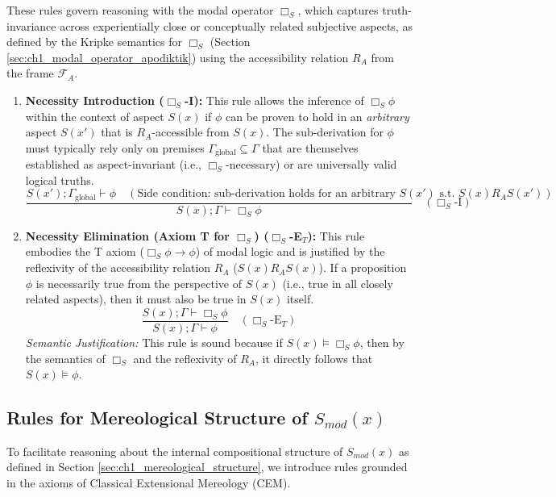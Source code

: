 \documentclass[
    12pt,              %
    a4paper,           %
    headings=normal,   %
    twoside=true,      %
    BCOR=8mm,          %
]{scrbook}
\newcommand{\BoxS}{\Box_S}
\begin{document}
These rules govern reasoning with the modal operator \(\BoxS\), which captures truth-invariance across experientially close or conceptually related subjective aspects, as defined by the Kripke semantics for \(\BoxS\) (Section \ref{sec:ch1_modal_operator_apodiktik}) using the accessibility relation \(R_A\) from the frame \(\mathcal{F}_A\).

\begin{enumerate}[label=(\alph*)]
    \item  \textbf{Necessity Introduction (\(\BoxS\)-I):}
    This rule allows the inference of \(\BoxS\phi\) within the context of aspect \(S(x)\) if \(\phi\) can be proven to hold in an \textit{arbitrary} aspect \(S(x')\) that is \(R_A\)-accessible from \(S(x)\). The sub-derivation for \(\phi\) must typically rely only on premises \(\Gamma_{\text{global}} \subseteq \Gamma\) that are themselves established as aspect-invariant (i.e., \(\BoxS\)-necessary) or are universally valid logical truths.
    \[ \frac{S(x'); \Gamma_{\text{global}} \vdash \phi \quad (\text{Side condition: sub-derivation holds for an arbitrary } S(x') \text{ s.t. } S(x) R_A S(x'))}{S(x); \Gamma \vdash \BoxS \phi} \quad (\BoxS\text{-I}) \]

    \item  \textbf{Necessity Elimination (Axiom T for \(\BoxS\)) (\(\BoxS\)-E\(_T\)):}
    This rule embodies the T axiom (\(\BoxS\phi \rightarrow \phi\)) of modal logic and is justified by the reflexivity of the accessibility relation \(R_A\) (\(S(x)R_A S(x)\)). If a proposition \(\phi\) is necessarily true from the perspective of \(S(x)\) (i.e., true in all closely related aspects), then it must also be true in \(S(x)\) itself.
    \[ \frac{S(x); \Gamma \vdash \BoxS \phi}{S(x); \Gamma \vdash \phi} \quad (\BoxS\text{-E}_T) \]
    \textit{Semantic Justification:} This rule is sound because if \(S(x) \vDash \BoxS\phi\), then by the semantics of \(\BoxS\) and the reflexivity of \(R_A\), it directly follows that \(S(x) \vDash \phi\).
\end{enumerate}

\subsection{Rules for Mereological Structure of \(S_{mod}(x)\)}
\label{sec:ch1_sequent_mereology} 

To facilitate reasoning about the internal compositional structure of \(S_{mod}(x)\) as defined in Section \ref{sec:ch1_mereological_structure}, we introduce rules grounded in the axioms of Classical Extensional Mereology (CEM).
\end{document}
